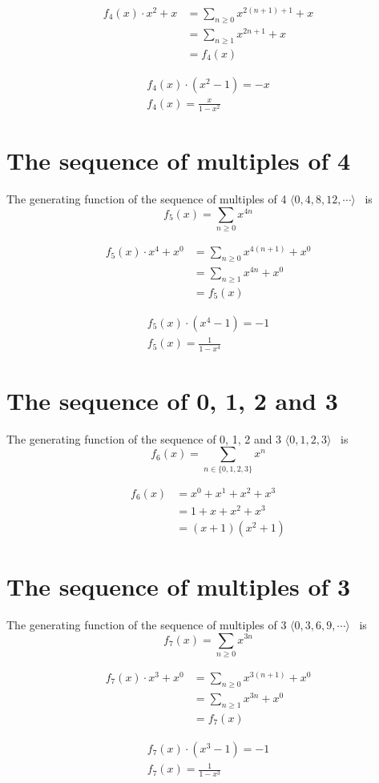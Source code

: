 \documentclass{article}
\begin{document}
\begin{align*}
    f_4(x) \cdot x^2 + x & = \sum_{n \geq 0} x^{2(n + 1) + 1} + x \\
                         & = \sum_{n \geq 1} x^{2n + 1} + x       \\
                         & = f_4(x)
\end{align*}

\begin{align*}
    f_4(x) \cdot (x^2 - 1) = -x \\
    f_4(x) = \frac{x}{1 - x^2}
\end{align*}

\section{The sequence of multiples of 4}
The generating function of the sequence of multiples of 4 $\langle 0, 4, 8, 12, \cdots \rangle$ \ is\\
$${f_5(x)} = {\sum_{n \geq 0} x^{4n}}$$

\begin{align*}
    f_5(x) \cdot x^4 + x^0 & = \sum_{n \geq 0} x^{4(n + 1)} + x^0 \\
                           & = \sum_{n \geq 1} x^{4n} + x^0       \\
                           & = f_5(x)
\end{align*}

\begin{align*}
    f_5(x) \cdot (x^4 - 1) = -1 \\
    f_5(x) = \frac{1}{1 - x^4}
\end{align*}

\section{The sequence of 0, 1, 2 and 3}
The generating function of the sequence of 0, 1, 2 and 3 $\langle 0, 1, 2, 3 \rangle$ \ is\\
$$f_6(x) = \sum_{n \in \{0, 1, 2, 3\}} x^n$$

\begin{align*}
    f_6(x) & = x^0 + x^1 + x^2 + x^3 \\
           & = 1 + x + x^2 + x^3     \\
           & = (x + 1)(x^2 + 1)
\end{align*}

\section{The sequence of multiples of 3}
The generating function of the sequence of multiples of 3 $\langle 0, 3, 6, 9, \cdots \rangle$ \ is\\
$${f_7(x)} = {\sum_{n \geq 0} x^{3n}}$$

\begin{align*}
    f_7(x) \cdot x^3 + x^0 & = \sum_{n \geq 0} x^{3(n + 1)} + x^0 \\
                           & = \sum_{n \geq 1} x^{3n} + x^0       \\
                           & = f_7(x)
\end{align*}

\begin{align*}
    f_7(x) \cdot (x^3 - 1) = -1 \\
    f_7(x) = \frac{1}{1 - x^3}
\end{align*}
\end{document}
